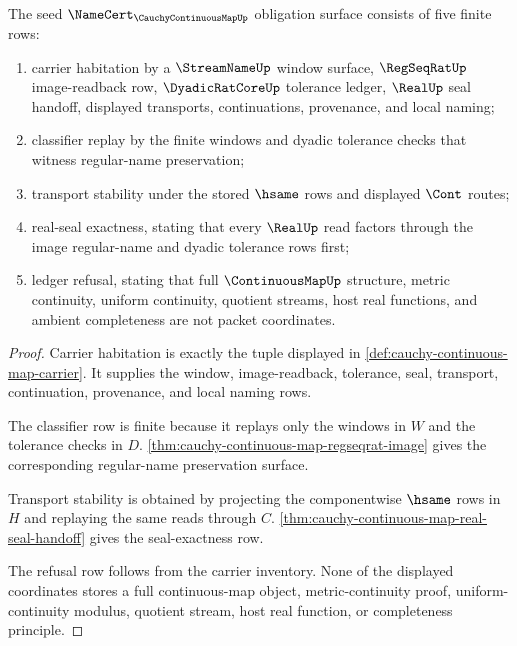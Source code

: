 \begin{theorem}
\label{thm:cauchy-continuous-map-namecert-obligations}
The seed $\NameCert_{\CauchyContinuousMapUp}$ obligation surface consists of five finite rows:
\begin{enumerate}
\item carrier habitation by a $\StreamNameUp$ window surface, $\RegSeqRatUp$ image-readback row, $\DyadicRatCoreUp$ tolerance ledger, $\RealUp$ seal handoff, displayed transports, continuations, provenance, and local naming;
\item classifier replay by the finite windows and dyadic tolerance checks that witness regular-name preservation;
\item transport stability under the stored $\hsame$ rows and displayed $\Cont$ routes;
\item real-seal exactness, stating that every $\RealUp$ read factors through the image regular-name and dyadic tolerance rows first;
\item ledger refusal, stating that full $\ContinuousMapUp$ structure, metric continuity, uniform continuity, quotient streams, host real functions, and ambient completeness are not packet coordinates.
\end{enumerate}
\end{theorem}
\begin{proof}
Carrier habitation is exactly the tuple displayed in \autoref{def:cauchy-continuous-map-carrier}. It supplies the window, image-readback, tolerance, seal, transport, continuation, provenance, and local naming rows.

The classifier row is finite because it replays only the windows in $W$ and the tolerance checks in $D$. \autoref{thm:cauchy-continuous-map-regseqrat-image} gives the corresponding regular-name preservation surface.

Transport stability is obtained by projecting the componentwise $\hsame$ rows in $H$ and replaying the same reads through $C$. \autoref{thm:cauchy-continuous-map-real-seal-handoff} gives the seal-exactness row.

The refusal row follows from the carrier inventory. None of the displayed coordinates stores a full continuous-map object, metric-continuity proof, uniform-continuity modulus, quotient stream, host real function, or completeness principle.
\end{proof}

